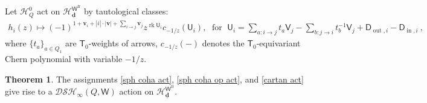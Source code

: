 \documentclass[10pt]{amsart}
\theoremstyle{definition}
\newtheorem{Theorem}{Theorem}[section]
\newtheorem{Remark}[Theorem]{Remark}
\numberwithin{equation}{section}
\newcommand{\bv}{\mathbf{v}}
\newcommand{\bd}{\mathbf{d}}
\newcommand{\sT}{\mathsf{T}}
\newcommand{\sW}{\mathsf{W}}
\newcommand{\rk}{\operatorname{rk}}
\newcommand{\In}{\operatorname{in}}
\newcommand{\Out}{\operatorname{out}}
\begin{document}

Let $\mathcal H^0_{Q}$ act on $\mathcal H_{\underline{\bd}}^{\sW^{\mathrm{fr}}}$ by tautological classes:
\begin{align}\label{cartan act}
    h_i(z)\mapsto (-1)^{1+\bv_i+|i|\cdot |\bv|+\sum_{i\to j}\bv_j}z^{\rk \mathsf U_i}c_{-1/z}\left(\mathsf U_i\right),\;\text{ for }\; \mathsf U_i=\sum_{a:i\to j}t_a\mathsf V_j-\sum_{b:j\to i}t_{b}^{-1}\mathsf V_j+\mathsf D_{\Out,i}-\mathsf D_{\In,i}\:,
\end{align}
where $\{t_a\}_{a\in Q_1}$ are $\sT_0$-weights of arrows, $c_{-1/z}(-)$ denotes the $\sT_0$-equivariant Chern polynomial with variable $-1/z$. 
\begin{Theorem}
\label{thm borel yangian action}
The assignments \eqref{sph coha act}, \eqref{sph coha op act}, and \eqref{cartan act} give rise to a $\mathcal{DSH}_\infty(Q,\sW)$ action on $\mathcal H_{\underline{\bd}}^{\sW^{\mathrm{fr}}}$.
\end{Theorem}
\end{document}

